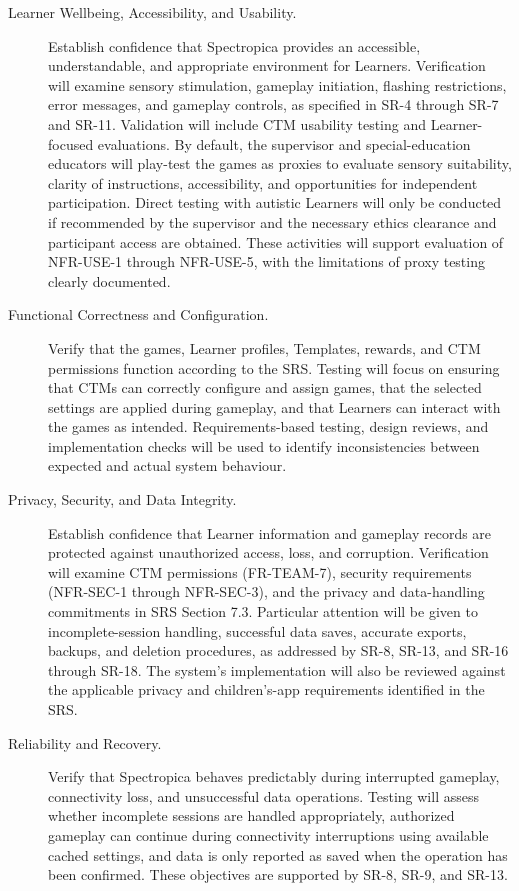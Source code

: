 \documentclass[12pt, titlepage]{article}
\begin{document}
\begin{description}

  \item[Learner Wellbeing, Accessibility, and Usability.] Establish confidence that Spectropica provides an accessible, understandable, and appropriate environment for Learners. Verification will examine sensory stimulation, gameplay initiation, flashing restrictions, error messages, and gameplay controls, as specified in SR-4 through SR-7 and SR-11. Validation will include CTM usability testing and Learner-focused evaluations. By default, the supervisor and special-education educators will play-test the games as proxies to evaluate sensory suitability, clarity of instructions, accessibility, and opportunities for independent participation. Direct testing with autistic Learners will only be conducted if recommended by the supervisor and the necessary ethics clearance and participant access are obtained. These activities will support evaluation of NFR-USE-1 through NFR-USE-5, with the limitations of proxy testing clearly documented.

  \item[Functional Correctness and Configuration.] Verify that the games, Learner profiles, Templates, rewards, and CTM permissions function according to the SRS. Testing will focus on ensuring that CTMs can correctly configure and assign games, that the selected settings are applied during gameplay, and that Learners can interact with the games as intended. Requirements-based testing, design reviews, and implementation checks will be used to identify inconsistencies between expected and actual system behaviour.

  \item[Privacy, Security, and Data Integrity.] Establish confidence that Learner information and gameplay records are protected against unauthorized access, loss, and corruption. Verification will examine CTM permissions (FR-TEAM-7), security requirements (NFR-SEC-1 through NFR-SEC-3), and the privacy and data-handling commitments in SRS Section 7.3. Particular attention will be given to incomplete-session handling, successful data saves, accurate exports, backups, and deletion procedures, as addressed by SR-8, SR-13, and SR-16 through SR-18. The system's implementation will also be reviewed against the applicable privacy and children's-app requirements identified in the SRS.

  \item[Reliability and Recovery.] Verify that Spectropica behaves predictably during interrupted gameplay, connectivity loss, and unsuccessful data operations. Testing will assess whether incomplete sessions are handled appropriately, authorized gameplay can continue during connectivity interruptions using available cached settings, and data is only reported as saved when the operation has been confirmed. These objectives are supported by SR-8, SR-9, and SR-13.


\end{description}
\end{document}
